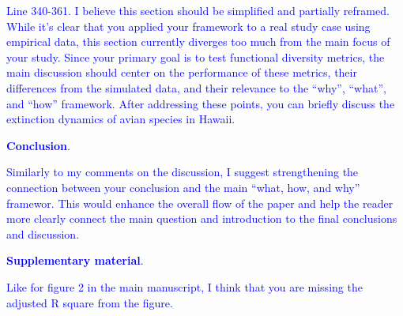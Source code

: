 \documentclass[
]{article}
\begin{document}
\textcolor{blue}{Line 340-361. I believe this section should be simplified and partially reframed.
While it's clear that you applied your framework to a real study case using empirical data, this section currently diverges too much from the main focus of your study.
Since your primary goal is to test functional diversity metrics, the main discussion should center on the performance of these metrics, their differences from the simulated data, and their relevance to the ``why'', ``what'', and ``how'' framework.
After addressing these points, you can briefly discuss the extinction dynamics of avian species in Hawaii.}

\textcolor{blue}{\textbf{Conclusion}.}

\textcolor{blue}{Similarly to my comments on the discussion, I suggest strengthening the connection between your conclusion and the main ``what, how, and why'' framewor.
This would enhance the overall flow of the paper and help the reader more clearly connect the main question and introduction to the final conclusions and discussion.}

\textcolor{blue}{\textbf{Supplementary material}.}

\textcolor{blue}{Like for figure 2 in the main manuscript, I think that you are missing the adjusted R square from the figure.}
\end{document}
